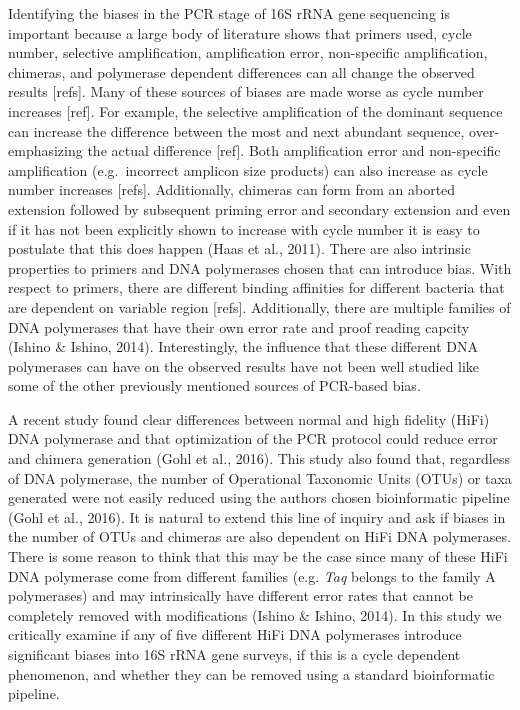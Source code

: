 \documentclass[12pt,]{article}
\begin{document}
Identifying the biases in the PCR stage of 16S rRNA gene sequencing is
important because a large body of literature shows that primers used,
cycle number, selective amplification, amplification error, non-specific
amplification, chimeras, and polymerase dependent differences can all
change the observed results {[}refs{]}. Many of these sources of biases
are made worse as cycle number increases {[}ref{]}. For example, the
selective amplification of the dominant sequence can increase the
difference between the most and next abundant sequence, over-emphasizing
the actual difference {[}ref{]}. Both amplification error and
non-specific amplification (e.g.~incorrect amplicon size products) can
also increase as cycle number increases {[}refs{]}. Additionally,
chimeras can form from an aborted extension followed by subsequent
priming error and secondary extension and even if it has not been
explicitly shown to increase with cycle number it is easy to postulate
that this does happen (Haas et al., 2011). There are also intrinsic
properties to primers and DNA polymerases chosen that can introduce
bias. With respect to primers, there are different binding affinities
for different bacteria that are dependent on variable region {[}refs{]}.
Additionally, there are multiple families of DNA polymerases that have
their own error rate and proof reading capcity (Ishino \& Ishino, 2014).
Interestingly, the influence that these different DNA polymerases can
have on the observed results have not been well studied like some of the
other previously mentioned sources of PCR-based bias.

A recent study found clear differences between normal and high fidelity
(HiFi) DNA polymerase and that optimization of the PCR protocol could
reduce error and chimera generation (Gohl et al., 2016). This study also
found that, regardless of DNA polymerase, the number of Operational
Taxonomic Units (OTUs) or taxa generated were not easily reduced using
the authors chosen bioinformatic pipeline (Gohl et al., 2016). It is
natural to extend this line of inquiry and ask if biases in the number
of OTUs and chimeras are also dependent on HiFi DNA polymerases. There
is some reason to think that this may be the case since many of these
HiFi DNA polymerase come from different families (e.g. \emph{Taq}
belongs to the family A polymerases) and may intrinsically have
different error rates that cannot be completely removed with
modifications (Ishino \& Ishino, 2014). In this study we critically
examine if any of five different HiFi DNA polymerases introduce
significant biases into 16S rRNA gene surveys, if this is a cycle
dependent phenomenon, and whether they can be removed using a standard
bioinformatic pipeline.
\end{document}
